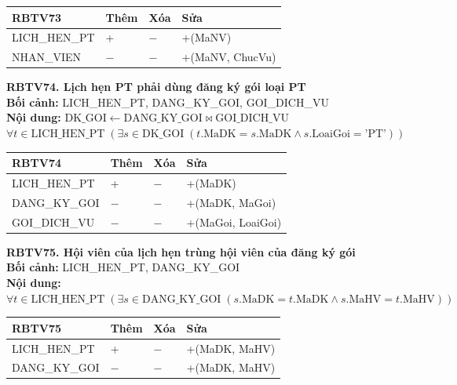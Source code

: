 \documentclass[11pt, a4paper]{article}
\begin{document}
\vspace{0.3em}
\begin{small}
\begin{tabularx}{\textwidth}{| C{4.2cm} | C{2cm} | C{2cm} | Y |}
\hline
\textbf{RBTV73} & \textbf{Thêm} & \textbf{Xóa} & \textbf{Sửa} \\
\hline
LICH\_HEN\_PT & + & $-$ & +(MaNV) \\
\hline
NHAN\_VIEN & $-$ & $-$ & +(MaNV, ChucVu) \\
\hline
\end{tabularx}
\end{small}

\vspace{0.8em}
\textbf{RBTV74. Lịch hẹn PT phải dùng đăng ký gói loại PT} \\
\textbf{Bối cảnh:} LICH\_HEN\_PT, DANG\_KY\_GOI, GOI\_DICH\_VU \\
\textbf{Nội dung:} $\text{DK\_GOI} \leftarrow \text{DANG\_KY\_GOI} \bowtie \text{GOI\_DICH\_VU}$ \\
$\forall t \in \text{LICH\_HEN\_PT} \; (\exists s \in \text{DK\_GOI} \; (t.\text{MaDK} = s.\text{MaDK} \land s.\text{LoaiGoi} = \text{'PT'}))$

\vspace{0.3em}
\begin{small}
\begin{tabularx}{\textwidth}{| C{4.2cm} | C{2cm} | C{2cm} | Y |}
\hline
\textbf{RBTV74} & \textbf{Thêm} & \textbf{Xóa} & \textbf{Sửa} \\
\hline
LICH\_HEN\_PT & + & $-$ & +(MaDK) \\
\hline
DANG\_KY\_GOI & $-$ & $-$ & +(MaDK, MaGoi) \\
\hline
GOI\_DICH\_VU & $-$ & $-$ & +(MaGoi, LoaiGoi) \\
\hline
\end{tabularx}
\end{small}

\vspace{0.8em}
\textbf{RBTV75. Hội viên của lịch hẹn trùng hội viên của đăng ký gói} \\
\textbf{Bối cảnh:} LICH\_HEN\_PT, DANG\_KY\_GOI \\
\textbf{Nội dung:} $\forall t \in \text{LICH\_HEN\_PT} \; (\exists s \in \text{DANG\_KY\_GOI} \; (s.\text{MaDK} = t.\text{MaDK} \land s.\text{MaHV} = t.\text{MaHV}))$

\vspace{0.3em}
\begin{small}
\begin{tabularx}{\textwidth}{| C{4.2cm} | C{2cm} | C{2cm} | Y |}
\hline
\textbf{RBTV75} & \textbf{Thêm} & \textbf{Xóa} & \textbf{Sửa} \\
\hline
LICH\_HEN\_PT & + & $-$ & +(MaDK, MaHV) \\
\hline
DANG\_KY\_GOI & $-$ & $-$ & +(MaDK, MaHV) \\
\hline
\end{tabularx}
\end{small}
\end{document}
